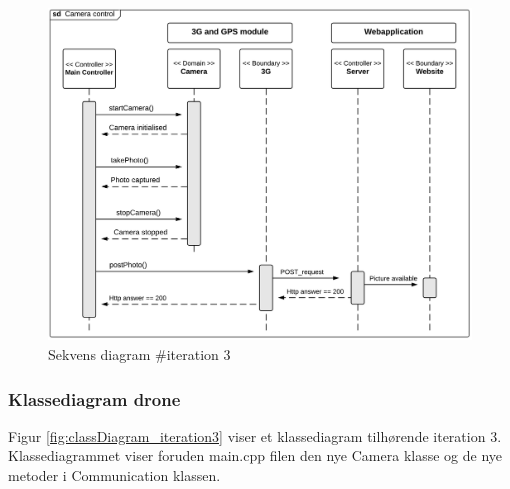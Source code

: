 \vspace{-0.2cm}
\begin{figure}[H]
	\centering
	\includegraphics[width=1\textwidth]{Billeder/sekvens/sekvens_iteration3}
	\caption{Sekvens diagram \#iteration 3}
	\label{fig:Sekvens_diagram_iteration3}
\end{figure}
\vspace{-0.2cm}

\newpage

\subsubsection*{Klassediagram drone}

Figur \ref{fig:classDiagram_iteration3} viser et klassediagram tilhørende iteration 3. Klassediagrammet viser foruden main.cpp filen den nye Camera klasse og de nye metoder i Communication klassen.

